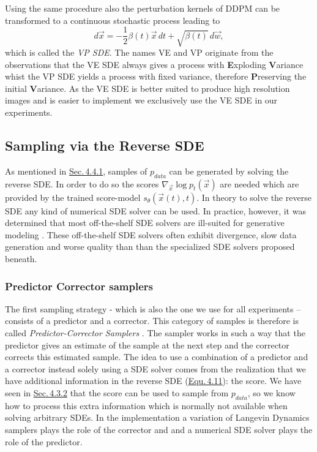Using the same procedure also the perturbation kernels of DDPM can be transformed to a continuous stochastic process leading to
%
\begin{equation} \label{equ:4.19}
    d\vec{x}=-\frac{1}{2}\beta(t)\vec{x}\,dt+\sqrt{\beta(t)}\,d\vec{w},
\end{equation}
%
which is called the \textit{VP SDE}. The names VE and VP originate from the observations that the VE SDE always gives a process with \textbf{E}xploding \textbf{V}ariance whist the VP SDE yields a process with fixed variance, therefore \textbf{P}reserving the initial \textbf{V}ariance. As the VE SDE is better suited to produce high resolution images and is easier to implement we exclusively use the VE SDE in our experiments.

\subsection{Sampling via the Reverse SDE}
As mentioned in \hyperref[sec:4.4.1]{Sec.\,4.4.1}, samples of $p_{data}$ can be generated by solving the reverse SDE. In order to do so the scores $\nabla_{\vec{x}}\log p_t(\vec{x})$ are needed which are provided by the trained score-model $s_\theta(\vec{x}(t),t)$. In theory to solve the reverse SDE any kind of numerical SDE solver can be used. In practice, however, it was determined that most off-the-shelf SDE solvers are ill-suited for generative modeling \cite{gotta_go_fast}. These off-the-shelf SDE solvers often exhibit divergence, slow data generation and worse quality than than the specialized SDE solvers proposed beneath.

\subsubsection{Predictor Corrector samplers}
The first sampling strategy - which is also the one we use for all experiments – consists of a predictor and a corrector. This category of samples is therefore is called \textit{Predictor-Corrector Samplers} \cite{score_3}. The sampler works in such a way that the predictor gives an estimate of the sample at the next step and the corrector corrects this estimated sample. The idea to use a combination of a predictor and a corrector instead solely using a SDE solver comes from the realization that we have additional information in the reverse SDE (\hyperref[equ:4.11]{Equ.\,4.11}): the score. We have seen in \hyperref[sec:4.3.2]{Sec.\,4.3.2} that the score can be used to sample from $p_{data}$, so we know how to process this extra information which is normally not available when solving arbitrary SDEs. In the implementation a variation of Langevin Dynamics samplers plays the role of the corrector and and a numerical SDE solver plays the role of the predictor.

